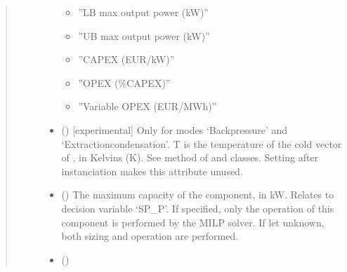\documentclass[letterpaper,10pt,english]{sphinxmanual}
\begin{document}
\begin{fulllineitems}
\begin{fulllineitems}
\begin{quote}
\begin{description}
\begin{itemize}
\begin{itemize}
\item {} 
\sphinxAtStartPar
”LB max output power (kW)”

\item {} 
\sphinxAtStartPar
”UB max output power (kW)”

\item {} 
\sphinxAtStartPar
”CAPEX (EUR/kW)”

\item {} 
\sphinxAtStartPar
”OPEX (\%CAPEX)”

\item {} 
\sphinxAtStartPar
”Variable OPEX (EUR/MWh)”

\end{itemize}


\item {} 
\sphinxAtStartPar
{} (\sphinxstyleliteralemphasis{\sphinxupquote{(}}\sphinxstyleliteralemphasis{\sphinxupquote{)}}) \textendash{} {[}experimental{]}
Only for modes ‘Back\sphinxhyphen{}pressure’ and ‘Extraction\sphinxhyphen{}condensation’.
T is the temperature of the cold vector of , in Kelvins (K).
See method  of  and  classes.
Setting  after instanciation makes this attribute unused.

\item {} 
\sphinxAtStartPar
{} (\sphinxstyleliteralemphasis{\sphinxupquote{, }}) \textendash{} The maximum capacity of the component, in kW.
Relates to decision variable ‘SP\_P’.
If specified, only the operation of this component is performed by the MILP solver.
If let unknown, both sizing and operation are performed.

\item {} 
\sphinxAtStartPar
{} (\sphinxstyleliteralemphasis{\sphinxupquote{, }}) \textendash{} 


\end{itemize}
\end{description}
\end{quote}
\end{fulllineitems}
\end{fulllineitems}
\end{document}
